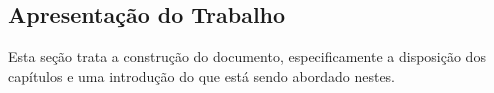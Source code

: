

\subsection{\textbf{Apresentação do Trabalho}}
    \label{sec:apresentacao-trabalho}
    
    Esta seção trata a construção do documento, especificamente a disposição dos capítulos e uma introdução do que está sendo abordado nestes.
